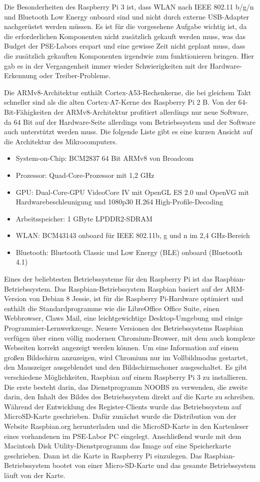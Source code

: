 Die Besonderheiten des Raspberry Pi 3 ist, dass WLAN nach IEEE 802.11 b/g/n und Bluetooth Low Energy onboard sind und nicht durch externe USB-Adapter nachgerüstet werden müssen. Es ist für die vorgesehene Aufgabe wichtig ist, da die erforderlichen Komponenten nicht zusätzlich gekauft werden muss, was das Budget der PSE-Labors erspart und eine gewisse Zeit nicht geplant muss, dass die zusätzlich gekauften Komponenten irgendwie zum funktionieren bringen. Hier gab es in der Vergangenheit immer wieder Schwierigkeiten mit der Hardware-Erkennung oder Treiber-Probleme. 

Die ARMv8-Architektur enthält Cortex-A53-Rechenkerne, die bei gleichem Takt schneller sind als die alten Cortex-A7-Kerne des Raspberry Pi 2 B. Von der 64-Bit-Fähigkeiten der ARMv8-Architektur profitiert allerdings nur neue Software, da 64 Bit auf der Hardware-Seite allerdings vom Betriebssystem und der Software auch unterstützt werden muss. Die folgende Liste gibt es eine kurzen Ansicht auf die Architektur des Mikrocomputers.
\begin{itemize}
	\item System-on-Chip: BCM2837 64 Bit ARMv8 von Broadcom
\item Prozessor: Quad-Core-Prozessor mit 1,2 GHz
\item GPU: Dual-Core-GPU VideoCore IV mit OpenGL ES 2.0 und OpenVG mit Hardwarebeschleunigung und 1080p30 H.264 High-Profile-Decoding
\item Arbeitsspeicher: 1 GByte LPDDR2-SDRAM
\item WLAN: BCM43143 onboard für IEEE 802.11b, g und n im 2,4 GHz-Bereich
\item Bluetooth: Bluetooth Classic und Low Energy (BLE) onboard (Bluetooth 4.1)  
\end{itemize}
Eines der beliebtesten Betriebssysteme für den Raspberry Pi ist das Raspbian-Betriebssystem. Das Raspbian-Betriebssystem Raspbian basiert auf der ARM-Version von Debian 8 Jessie, ist für die Raspberry Pi-Hardware optimiert  und enthält die Standardprogramme wie die LibreOffice Office Suite, einen Webbrowser, Claws Mail, eine leichtgewichtige Desktop-Umgebung und einige Programmier-Lernwerkzeuge. Neuere Versionen des Betriebssystems Raspbian verfügen über einen völlig modernen Chromium-Browser, mit dem auch komplexe Webseiten korrekt angezeigt werden können. Um eine Information auf einem großen Bildschirm anzuzeigen, wird Chromium nur im Vollbildmodus gestartet, den Mauszeiger ausgeblendet und den Bildschirmschoner ausgeschaltet. Es gibt verschiedene Möglichkeiten, Raspbian auf einem Raspberry Pi 3 zu installieren. Die erste besteht darin, das Dienstprogramm NOOBS zu verwenden, die zweite darin, den Inhalt des Bildes des Betriebssystem direkt auf die Karte zu schreiben. Während der Entwicklung des Register-Clients wurde das Betriebssystem auf MicroSD-Karte geschrieben. Dafür zunächst wurde die Distribution von der Website Raspbian.org herunterladen und die MicroSD-Karte in den Kartenleser eines vorhandenen im PSE-Labor PC eingelegt. Anschließend wurde mit dem Macintosh Disk Utility-Dienstprogramm das Image auf eine Speicherkarte geschrieben. Dann ist die Karte in Raspberry Pi einzulegen. Das Raspbian-Betriebssystem bootet von einer Micro-SD-Karte und das gesamte Betriebssystem läuft von der Karte. 

